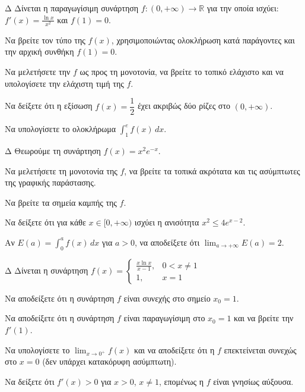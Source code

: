 \begin{thema}{Δ}
Δίνεται η παραγωγίσιμη συνάρτηση $f:(0, +\infty)\to\mathbb{R}$ για την οποία ισχύει: $f'(x) = \frac{\ln x}{x^2}$ και $f(1)=0$.
\begin{erwthma}
    \item Να βρείτε τον τύπο της $f(x)$, χρησιμοποιώντας ολοκλήρωση κατά παράγοντες και την αρχική συνθήκη $f(1)=0$.
    \item Να μελετήσετε την $f$ ως προς τη μονοτονία, να βρείτε το τοπικό ελάχιστο και να υπολογίσετε την ελάχιστη τιμή της $f$.
    \item Να δείξετε ότι η εξίσωση $f(x) = \dfrac{1}{2}$ έχει ακριβώς δύο ρίζες στο $(0, +\infty)$.
    \item Να υπολογίσετε το ολοκλήρωμα $\displaystyle\int_1^e f(x)\,dx$.
\end{erwthma}
\end{thema}

\begin{thema}{Δ}
Θεωρούμε τη συνάρτηση $f(x) = x^2e^{-x}$.
\begin{erwthma}
    \item Να μελετήσετε τη μονοτονία της $f$, να βρείτε τα τοπικά ακρότατα και τις ασύμπτωτες της γραφικής παράστασης.
    \item Να βρείτε τα σημεία καμπής της $f$.
    \item Να δείξετε ότι για κάθε $x \in [0,+\infty)$ ισχύει η ανισότητα $x^2 \leq 4e^{x-2}$.
    \item Αν $E(a) = \displaystyle\int_0^a f(x)\,dx$ για $a > 0$, να αποδείξετε ότι $\displaystyle\lim_{a \to +\infty} E(a) = 2$.
\end{erwthma}
\end{thema}

\begin{thema}{Δ}
Δίνεται η συνάρτηση $f(x) = \begin{cases} \frac{x \ln x}{x-1}, & 0 < x \ne 1 \\ 1, & x = 1 \end{cases}$
\begin{erwthma}
    \item Να αποδείξετε ότι η συνάρτηση $f$ είναι συνεχής στο σημείο $x_0 = 1$.
    \item Να αποδείξετε ότι η συνάρτηση $f$ είναι παραγωγίσιμη στο $x_0 = 1$ και να βρείτε την $f'(1)$.
    \item Να υπολογίσετε το $\displaystyle\lim_{x \to 0^+} f(x)$ και να αποδείξετε ότι η $f$ επεκτείνεται συνεχώς στο $x=0$ (δεν υπάρχει κατακόρυφη ασύμπτωτη).
    \item Να δείξετε ότι $f'(x) > 0$ για $x > 0$, $x \ne 1$, επομένως η $f$ είναι γνησίως αύξουσα.
\end{erwthma}
\end{thema}

